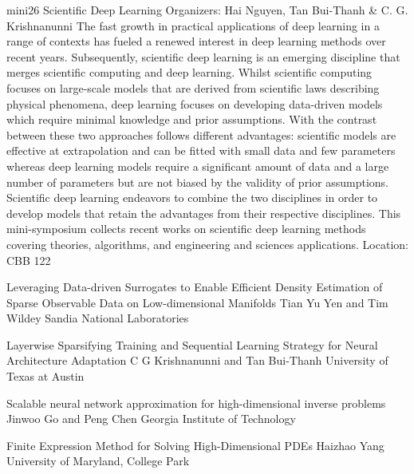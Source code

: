 \mini
{mini26}
{Scientific Deep Learning}
{Organizers: Hai Nguyen, Tan Bui-Thanh \& C. G. Krishnanunni}
{The fast growth in practical applications of deep learning in a range of contexts has fueled a renewed interest in deep learning methods over recent years. Subsequently, scientific deep learning is an emerging discipline that merges scientific computing and deep learning. Whilst scientific computing focuses on large-scale models that are derived from scientific laws describing physical phenomena, deep learning focuses on developing data-driven models which require minimal knowledge and prior assumptions. With the contrast between these two approaches follows different advantages: scientific models are effective at extrapolation and can be fitted with small data and few parameters whereas deep learning models require a significant amount of data and a large number of parameters but are not biased by the validity of prior assumptions. Scientific deep learning endeavors to combine the two disciplines in order to develop models that retain the advantages from their respective disciplines. This mini-symposium collects recent works on scientific deep learning methods covering theories, algorithms, and engineering and sciences applications.}
{Location: CBB 122}

\begin{talks}
\item\talk
{Leveraging Data-driven Surrogates to Enable Efficient Density Estimation of Sparse Observable Data on Low-dimensional Manifolds}
{Tian Yu Yen and Tim Wildey}
{Sandia National Laboratories}
\item\talk
{Layerwise Sparsifying Training and Sequential Learning Strategy for Neural Architecture Adaptation}
{C G Krishnanunni and Tan Bui-Thanh}
{University of Texas at Austin}
\item\talk
{Scalable neural network approximation for high-dimensional inverse problems}
{Jinwoo Go and Peng Chen}
{Georgia Institute of Technology}
\item\talk
{Finite Expression Method for Solving High-Dimensional PDEs}
{Haizhao Yang}
{University of Maryland, College Park}
\end{talks}
\room
